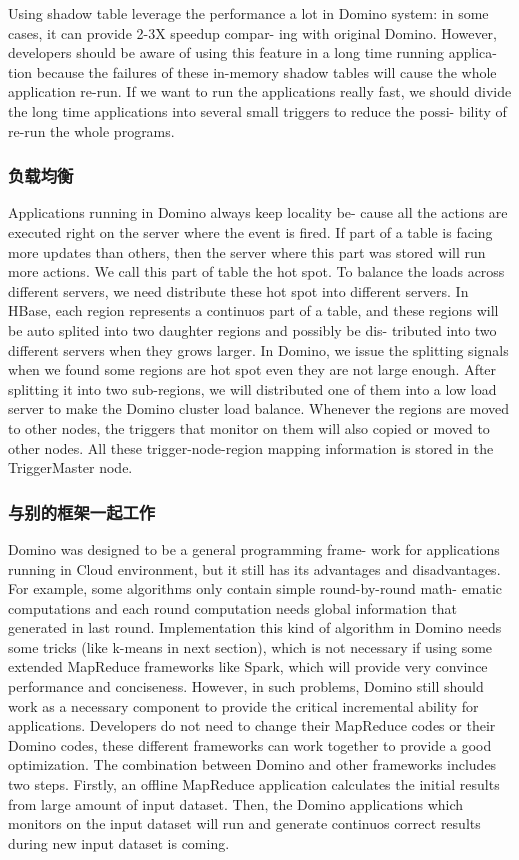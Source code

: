 Using shadow table leverage the performance a lot in Domino system: in some cases, it can provide 2-3X speedup compar- ing with original Domino. However, developers should be aware of using this feature in a long time running applica- tion because the failures of these in-memory shadow tables will cause the whole application re-run. If we want to run the applications really fast, we should divide the long time applications into several small triggers to reduce the possi- bility of re-run the whole programs.

\subsubsection{负载均衡}
Applications running in Domino always keep locality be- cause all the actions are executed right on the server where the event is fired. If part of a table is facing more updates than others, then the server where this part was stored will run more actions. We call this part of table the hot spot. To balance the loads across different servers, we need distribute these hot spot into different servers. In HBase, each region represents a continuos part of a table, and these regions will be auto splited into two daughter regions and possibly be dis- tributed into two different servers when they grows larger. In Domino, we issue the splitting signals when we found some regions are hot spot even they are not large enough. After splitting it into two sub-regions, we will distributed one of them into a low load server to make the Domino cluster load balance. Whenever the regions are moved to other nodes, the triggers that monitor on them will also copied or moved to other nodes. All these trigger-node-region mapping information is stored in the TriggerMaster node.

\subsubsection{与别的框架一起工作}
Domino was designed to be a general programming frame- work for applications running in Cloud environment, but it still has its advantages and disadvantages. For example, some algorithms only contain simple round-by-round math- ematic computations and each round computation needs global information that generated in last round. Implementation this kind of algorithm in Domino needs some tricks (like k-means in next section), which is not necessary if using some extended MapReduce frameworks like Spark, which will provide very convince performance and conciseness.
However, in such problems, Domino still should work as a necessary component to provide the critical incremental ability for applications. Developers do not need to change their MapReduce codes or their Domino codes, these different frameworks can work together to provide a good optimization. The combination between Domino and other frameworks includes two steps. Firstly, an offline MapReduce application calculates the initial results from large amount of input dataset. Then, the Domino applications which monitors on the input dataset will run and generate continuos correct results during new input dataset is coming.

